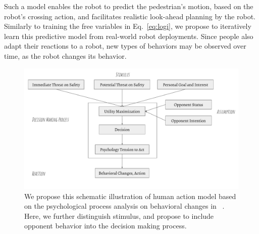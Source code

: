 \documentclass[conference]{IEEEtran}
\begin{document}
Such a model enables the robot to predict the pedestrian's motion,
based on the 
robot's crossing action, and facilitates realistic look-ahead planning by the robot.
Similarly to training the free variables in Eq.~\ref{eq:logi}, we propose to iteratively learn 
this predictive model from real-world robot 
deployments. Since people also adapt their reactions to a robot, 
new types of behaviors may be observed over time, as the robot changes its behavior.




\begin{figure}[tb]
  \begin{center}
  \hspace*{-2em}
    \includegraphics[width=1.05\columnwidth]{images/behavior_change.pdf}
  \hspace*{-2em}
  \vspace*{-1.5em}
  \end{center}
  \vspace{-0.05in}
  \caption{We propose this schematic illustration of human action model based 
    on the psychological process analysis on behavioral changes in ~\cite{helbing1995social}.
    Here, we further distinguish stimulus, and propose to include opponent 
    behavior into the decision making process.}
\vspace{-0.11in}
\label{fig:behavior}
\end{figure}
\end{document}
